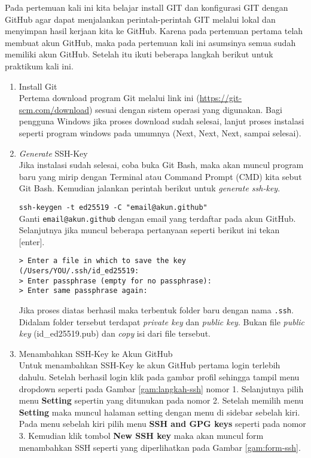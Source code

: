 \documentclass[a4paper]{tufte-handout}
\begin{document}
\hrulefill

\clearpage
{}


Pada pertemuan kali ini kita belajar install GIT dan konfigurasi GIT dengan GitHub agar dapat menjalankan perintah-perintah GIT melalui lokal dan menyimpan hasil kerjaan kita ke GitHub. Karena pada pertemuan pertama telah membuat akun GitHub, maka pada pertemuan kali ini asumsinya semua sudah memiliki akun GitHub. Setelah itu ikuti beberapa langkah berikut untuk praktikum kali ini.

\begin{enumerate}
\item Install Git \\
Pertema download program Git melalui link ini (\url{https://git-scm.com/download}) sesuai dengan sistem operasi yang digunakan. Bagi pengguna Windows jika proses download sudah selesai, lanjut proses instalasi seperti program windows pada umumnya (Next, Next, Next, sampai selesai).

\item \textit{Generate} SSH-Key \\
Jika instalasi sudah selesai, coba buka Git Bash, maka akan muncul program baru yang mirip dengan Terminal atau Command Prompt (CMD) kita sebut Git Bash. Kemudian jalankan perintah berikut untuk \textit{generate ssh-key}.

{\tt ssh-keygen -t ed25519 -C "email@akun.github"} \\

Ganti {\tt email@akun.github} dengan email yang terdaftar pada akun GitHub. Selanjutnya jika muncul beberapa pertanyaan seperti berikut ini tekan [enter].

{\tt > Enter a file in which to save the key (/Users/YOU/.ssh/id\_ed25519:} \\
{\tt > Enter passphrase (empty for no passphrase):} \\
{\tt > Enter same passphrase again:}

Jika proses diatas berhasil maka terbentuk folder baru dengan nama {\tt .ssh}. Didalam folder tersebut terdapat \textit{private key} dan \textit{public key}. Bukan file \textit{public key} (id\_ed25519.pub) dan \textit{copy} isi dari file tersebut.

\item Menambahkan SSH-Key ke Akun GitHub \\
Untuk menambahkan SSH-Key ke akun GitHub pertama login terlebih dahulu. Setelah berhasil login klik pada gambar profil sehingga tampil menu dropdown seperti pada Gambar \ref{gam:langkah-ssh} nomor 1. Selanjutnya pilih menu \textbf{Setting} sepertin yang ditunukan pada nomor 2. Setelah memilih menu \textbf{Setting} maka muncul halaman setting dengan menu di sidebar sebelah kiri. Pada menu sebelah kiri pilih menu \textbf{SSH and GPG keys} seperti pada nomor 3. Kemudian klik tombol \textbf{New SSH key} maka akan muncul form menambahkan SSH seperti yang diperlihatkan pada Gambar \ref{gam:form-ssh}.


\end{enumerate}
\end{document}

